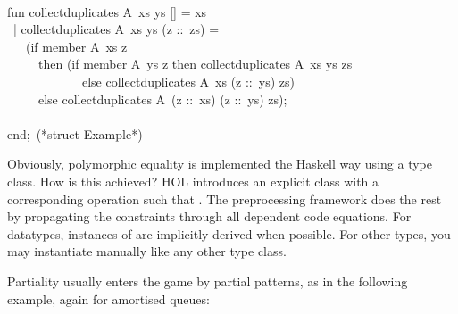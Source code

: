 \begin{isabellebody}
\begin{isamarkuptext}
\hspace*{0pt}\\
\hspace*{0pt}fun collect{}duplicates A{}~xs ys [] = xs\\
\hspace*{0pt} ~| collect{}duplicates A{}~xs ys (z ::~zs) =\\
\hspace*{0pt} ~~~(if member A{}~xs z\\
\hspace*{0pt} ~~~~~then (if member A{}~ys z then collect{}duplicates A{}~xs ys zs\\
\hspace*{0pt} ~~~~~~~~~~~~else collect{}duplicates A{}~xs (z ::~ys) zs)\\
\hspace*{0pt} ~~~~~else collect{}duplicates A{}~(z ::~xs) (z ::~ys) zs);\\
\hspace*{0pt}\\
\hspace*{0pt}end;~(*struct Example*)%
\end{isamarkuptext}%
\isamarkuptrue%
%
\endisatagquote
{\isafoldquote}%
%
\isadelimquote
%
\endisadelimquote
%
\begin{isamarkuptext}%
\noindent Obviously, polymorphic equality is implemented the Haskell
  way using a type class.  How is this achieved?  HOL introduces an
  explicit class  with a corresponding operation  such that .  The preprocessing
  framework does the rest by propagating the  constraints
  through all dependent code equations.  For datatypes, instances of
   are implicitly derived when possible.  For other types,
  you may instantiate  manually like any other type class.%
\end{isamarkuptext}%
\isamarkuptrue%
%
\isamarkuptrue%
%
\begin{isamarkuptext}%
Partiality usually enters the game by partial patterns, as
  in the following example, again for amortised queues:%
\end{isamarkuptext}%
\isamarkuptrue%
%
\isadelimquote
%
\endisadelimquote
%
\isatagquote
{}\isamarkupfalse%

\end{isabellebody}
